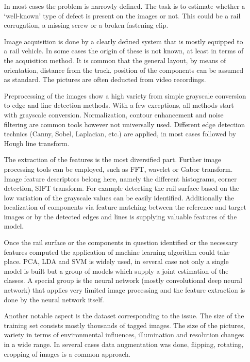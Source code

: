 \documentclass[10pt, final]{article}
\begin{document}
In most cases the problem is narrowly defined.
The task is to estimate whether a `well-known' type of defect is present on the images or not.
This could be a rail corrugation, a missing screw or a broken fastening clip.

Image acquisition is done by a clearly defined system that is mostly equipped to a rail vehicle.
In some cases the origin of these is not known, at least in terms of the acquisition method.
It is common that the general layout, by means of orientation, distance from the track, position of the components
can be assumed as standard.
The pictures are often deducted from video recordings.

Preprocessing of the images show a high variety from simple grayscale conversion to edge and line detection methods.
With a few exceptions, all methods start with grayscale conversion.
Normalization, contour enhancement and noise filtering are common tools however not universally used.
Different edge detection technics (Canny, Sobel, Laplacian, etc.) are applied, in most cases followed by Hough line
transform.

The extraction of the features is the most diversified part.
Further image processing tools can be employed, such as FFT, wavelet or Gabor transform.
Image feature descriptors belong here, namely the different histograms, corner detection, SIFT transform.
For example detecting the rail surface based on the low variation of the grayscale values can be easily identified.
Additionally the localization of components via feature matching between the reference and target images or by the
detected edges and lines is supplying valuable features of the model.

Once the rail surface or the components in question identified or the necessary features computed the application of
machine learning algorithm could take place.
PCA, LDA and SVM is widely used, in several case not only a single model is built but a group of models which
supply a joint estimation of the classes.
A special group is the neural network (mostly convolutional deep neural network) that applies very limited image
processing and the feature extraction is done by the neural network itself.

Another notable aspect is the dataset corresponding to the issue.
The size of the training set consists mostly thousands of tagged images.
The size of the pictures, variety in terms of environmental influences, illumination and resolution changes in a wide range.
In several cases data augmentation was done, flipping, rotating, cropping of images is a common approach.
\end{document}
